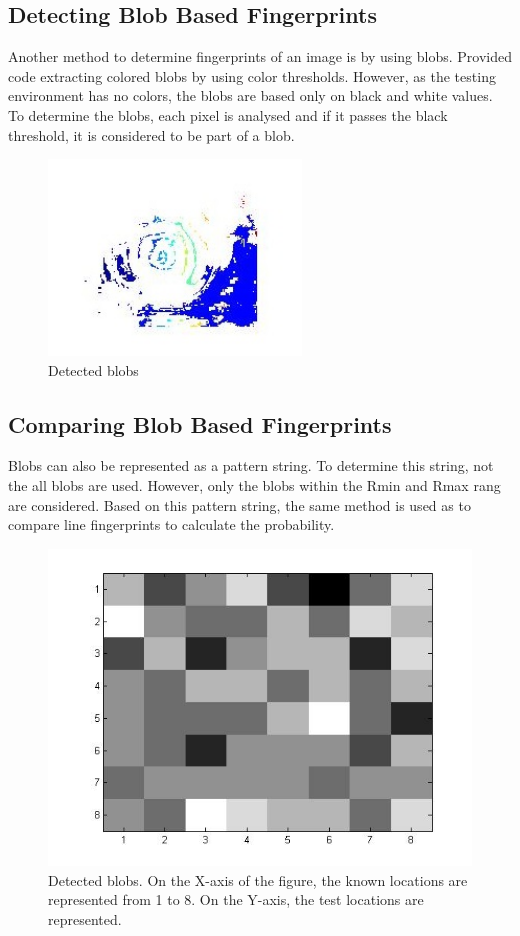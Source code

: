 \documentclass[12pt]{article}
\begin{document}
\subsection{Detecting Blob Based Fingerprints}
Another method to determine fingerprints of an image is by using blobs. Provided code extracting colored blobs by using color thresholds. However, as the testing environment has no colors, the blobs are based only on black and white values. To determine the blobs, each pixel is analysed and if it passes the black threshold, it is considered to be part of a blob. 

\begin{figure}[H]
	\centering
	\includegraphics[width=0.6\textwidth]{blobs.jpg}
	\caption{Detected blobs}
\end{figure}

\subsection{Comparing Blob Based Fingerprints}
Blobs can also be represented as a pattern string. To determine this string, not the all blobs are used. However, only the blobs within the Rmin and Rmax rang are considered. Based on this pattern string, the same method is used as to compare line fingerprints to calculate the probability.

\begin{figure}[H]
	\centering
	\includegraphics[width=\textwidth]{blobs_chance.jpg}
	\caption{Detected blobs. On the X-axis of the figure, the known locations are represented from 1 to 8. On the Y-axis, the test locations are represented.}
\end{figure}
\end{document}
